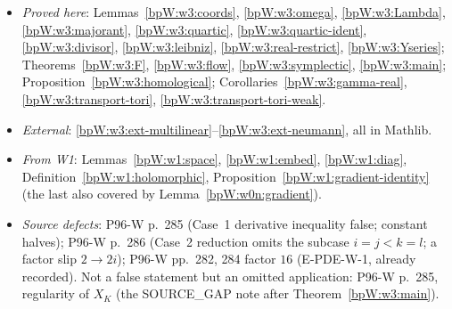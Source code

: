 \begin{itemize}
\item \emph{Proved here}: Lemmas~\ref{bpW:w3:coords}, \ref{bpW:w3:omega}, \ref{bpW:w3:Lambda},
  \ref{bpW:w3:majorant}, \ref{bpW:w3:quartic}, \ref{bpW:w3:quartic-ident}, \ref{bpW:w3:divisor},
  \ref{bpW:w3:leibniz}, \ref{bpW:w3:real-restrict}, \ref{bpW:w3:Yseries}; Theorems~\ref{bpW:w3:F}, \ref{bpW:w3:flow}, \ref{bpW:w3:symplectic}, \ref{bpW:w3:main};
  Proposition~\ref{bpW:w3:homological}; Corollaries~\ref{bpW:w3:gamma-real}, \ref{bpW:w3:transport-tori}, \ref{bpW:w3:transport-tori-weak}.
\item \emph{External}: \ref{bpW:w3:ext-multilinear}--\ref{bpW:w3:ext-neumann}, all in Mathlib.
\item \emph{From W1}: Lemmas~\ref{bpW:w1:space}, \ref{bpW:w1:embed}, \ref{bpW:w1:diag},
  Definition~\ref{bpW:w1:holomorphic}, Proposition~\ref{bpW:w1:gradient-identity} (the last also covered by
  Lemma~\ref{bpW:w0n:gradient}).
\item \emph{Source defects}: P96-W p.~285 (Case~1 derivative inequality false; constant halves); P96-W p.~286
  (Case~2 reduction omits the subcase $i=j<k=l$; a factor slip $2\to2i$); P96-W pp.~282, 284 factor $16$
  (E-PDE-W-1, already recorded). Not a false statement but an omitted application: P96-W p.~285, regularity of $X_K$
  (the \textsf{SOURCE\_GAP} note after Theorem~\ref{bpW:w3:main}).
\end{itemize}
